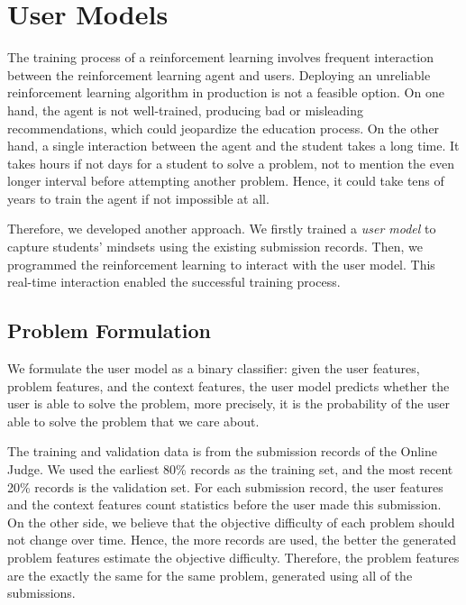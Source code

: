 
\chapter{User Models}

    The training process of a reinforcement learning involves frequent interaction
    between the reinforcement learning agent and users.
    Deploying an unreliable reinforcement learning algorithm in production is not a feasible option.
    On one hand, the agent is not well-trained, producing bad or misleading recommendations,
    which could jeopardize the education process.
    On the other hand, a single interaction between the agent and the student takes a long time.
    It takes hours if not days for a student to solve a problem,
    not to mention the even longer interval before attempting another problem.
    Hence, it could take tens of years to train the agent if not impossible at all.

    Therefore, we developed another approach.
    We firstly trained a \emph{user model} to capture students' mindsets using the existing submission records.
    Then, we programmed the reinforcement learning to interact with the user model.
    This real-time interaction enabled the successful training process.


\section{Problem Formulation}

    We formulate the user model as a binary classifier:
    given the user features, problem features, and the context features,
    the user model predicts whether the user is able to solve the problem,
    more precisely,
    it is the probability of the user able to solve the problem that we care about.

    The training and validation data is from the submission records of the Online Judge.
    We used the earliest 80\% records as the training set,
    and the most recent 20\% records is the validation set.
    For each submission record, the user features and the context features
    count statistics before the user made this submission.
    On the other side, we believe that the objective difficulty of each problem should not change over time.
    Hence, the more records are used, the better the generated problem features estimate the objective difficulty.
    Therefore, the problem features are the exactly the same for the same problem,
    generated using all of the submissions.

